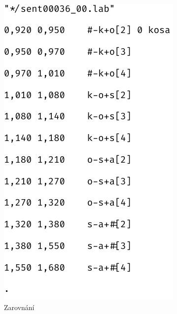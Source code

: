 \begin{figure}[htpb]
  \centering
  \begin{subfigure}[b]{0.26\textwidth}
    \includegraphics[width=\textwidth]{./ch6-realisation/img/alignment_text-2.pdf}
    \caption{Zarovnání}
    \label{fig:realisation:augmentation:alignemnt:correct:text}
  \end{subfigure}
  \begin{subfigure}[b]{0.65\textwidth}

\end{subfigure}
\end{figure}

